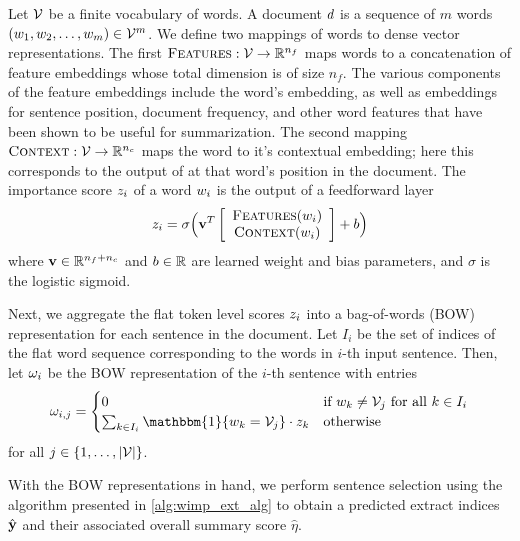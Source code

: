 Let $\mathcal{V}$ be a finite vocabulary of words. A document $d$
is a sequence of $m$ words $(w_1, w_2, \ldots, w_m) \in \mathcal{V}^m$.
We define two mappings of words to dense vector representations.
The first $\textsc{Features} : \mathcal{V} \rightarrow \mathbb{R}^{n_f}$ maps words to 
a concatenation of feature embeddings whose total dimension is of size $n_f$. 
The various components of the feature embeddings include the word's \glove{} 
embedding, as well as embeddings for sentence position, document frequency,
and other word features that have been shown to be useful for summarization.
The second mapping
$\textsc{Context} : \mathcal{V} \rightarrow \mathbb{R}^{n_c}$ maps the word to it's contextual
embedding; here this corresponds to the output of \elmo{} 
\citep{peters2018deep} at that word's
position in the document. 
The importance score $z_i$ of a word $w_i$ is the output of 
a feedforward layer 
\[ z_i = \sigma\Big(\mathbf{v}^T \left[\begin{array}{c} \textsc{Features}(w_i) \\ \textsc{Context}(w_i) \end{array} \right] + b \Big) \]
    where $\mathbf{v} \in \mathbb{R}^{n_f + n_c}$ and $b \in \mathbb{R}$ are learned weight
and bias parameters, and $\sigma$ is the logistic sigmoid.

Next, we aggregate the flat token level scores $z_i$ into a
bag-of-words (BOW) 
representation for each sentence in the document.
Let $I_i$ be the set of indices of the flat word sequence corresponding
to the words in $i$-th input sentence. Then, let $\omega_i$ be the BOW 
representation of the $i$-th sentence with entries 
\[ \bow_{i,j} = \begin{cases} 
    0 & \textrm{if $\word_k \ne \vocab_j $ for all $k \in I_i $} \\ 
\sum_{k \in I_i} \mathbbm{1}\{\word_k = \vocab_j \} \cdot \wordImportance_k  & \textrm{otherwise}     \end{cases} \]
        for all $j \in \{1, \ldots, |\mathcal{V}|\}$.





        With the BOW representations in hand, we perform sentence selection
        using the algorithm presented in \autoref{alg:wimp_ext_alg} to 
        obtain a predicted extract indices $\hat{\mathbf{y}}$ and their associated
        overall summary score $\hat{\eta}$.

